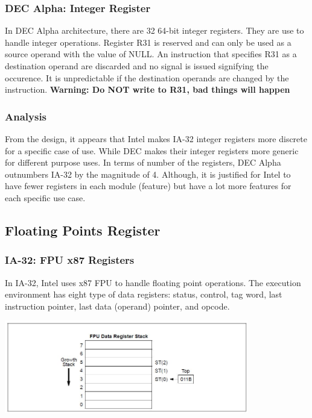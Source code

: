\documentclass[letterpaper,10pt,titlepage]{article}
\begin{document}
\subsubsection{DEC Alpha: Integer Register}
In DEC Alpha architecture, there are 32 64-bit integer registers. They are use
to handle integer operations. Register R31 is reserved and can only be used as 
a source operand with the value of NULL. An instruction that specifies R31 as 
a destination operand are discarded and no signal is issued signifying the 
occurence. It is unpredictable if the destination operands are changed by
the instruction. \textbf{Warning: Do NOT write to R31, bad things will happen}

\subsubsection{Analysis}
From the design, it appears that Intel makes IA-32 integer registers more 
discrete for a specific case of use. While DEC makes their integer registers 
more generic for different purpose uses. In terms of number of the registers,
DEC Alpha outnumbers IA-32 by the magnitude of 4. Although, it is justified
for Intel to have fewer registers in each module (feature) but have a lot more
features for each specific use case.


\subsection{Floating Points Register}
\subsubsection{IA-32: FPU x87 Registers}
In IA-32, Intel uses x87 FPU to handle floating point operations. The
execution environment has eight type of data registers: status, control,
tag word, last instruction pointer, last data (operand) pointer, and opcode.

\begin{center}
   \includegraphics[width=0.8\textwidth]{x86_fpu_stk.JPG}
\end{center}
\end{document}
